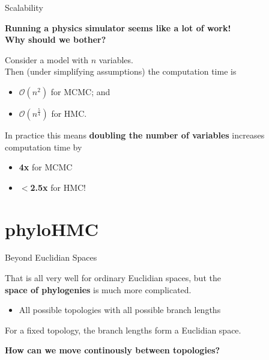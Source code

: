 \documentclass{beamer}
\begin{document}
\begin{frame}{Scalability}

  \textbf{Running a physics simulator seems like a lot of work! \\ Why should we bother?}

  \pause

  \begin{theorem}[Creutz 1988]
    Consider a model with $n$ variables. \\
    Then (under simplifying assumptions) the computation time is
    \begin{itemize}
      \item $\mathcal{O}\left(n^2\right)$ for MCMC; and
      \item $\mathcal{O}\left(n^\frac{5}{4}\right)$ for HMC.
    \end{itemize}
  \end{theorem}

  \pause

  In practice this means \textbf{doubling the number of variables} increases computation time by
  \begin{itemize}
    \item \textbf{4x} for MCMC
    \item \textbf{$<$2.5x} for HMC!
  \end{itemize}

\end{frame}

\section{phyloHMC}

\begin{frame}{Beyond Euclidian Spaces}

That is all very well for ordinary Euclidian spaces, but the \\ \textbf{space of phylogenies} is much more complicated.
\begin{itemize}
  \item All possible topologies with all possible branch lengths
\end{itemize}
\vspace{16pt}
\pause

For a fixed topology, the branch lengths form a Euclidian space.
\vspace{16pt}
\pause

\textbf{How can we move continously between topologies?}

\end{frame}
\end{document}
